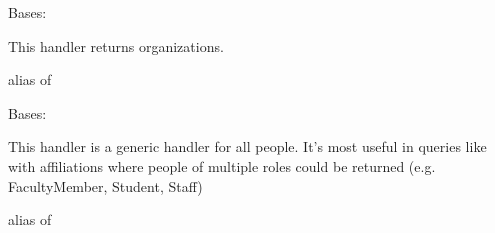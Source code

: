\documentclass[letterpaper,10pt,english]{sphinxmanual}
\begin{document}

\begin{fulllineitems}
\label{generated/apps.profiles.handlers:apps.profiles.handlers.OrganizationHandler}
Bases: 

This handler returns organizations.


\begin{fulllineitems}
\label{generated/apps.profiles.handlers:apps.profiles.handlers.OrganizationHandler.model}
alias of 

\end{fulllineitems}



\begin{fulllineitems}
\label{generated/apps.profiles.handlers:apps.profiles.handlers.OrganizationHandler.queryset}
\end{fulllineitems}


\end{fulllineitems}



\begin{fulllineitems}
\label{generated/apps.profiles.handlers:apps.profiles.handlers.PersonHandler}
Bases: 

This handler is a generic handler for all people.  It's most useful in
queries like with affiliations where people of multiple roles could be 
returned (e.g. FacultyMember, Student, Staff)


\begin{fulllineitems}
\label{generated/apps.profiles.handlers:apps.profiles.handlers.PersonHandler.model}
alias of 

\end{fulllineitems}



\begin{fulllineitems}
\label{generated/apps.profiles.handlers:apps.profiles.handlers.PersonHandler.queryset}
\end{fulllineitems}


\end{fulllineitems}
\end{document}
